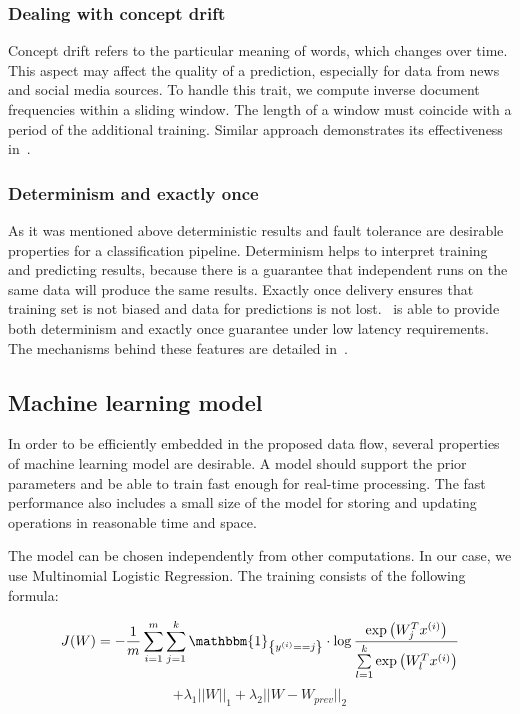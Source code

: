\subsubsection{Dealing with concept drift}

Concept drift refers to the particular meaning of words, which changes over time. This aspect may affect the quality of a prediction, especially for data from news and social media sources. To handle this trait, we compute inverse document frequencies within a sliding window. The length of a window must coincide with a period of the additional training. Similar approach demonstrates its effectiveness in~\cite{klinkenberg2000detecting}.

\subsubsection{Determinism and exactly once}

As it was mentioned above deterministic results and fault tolerance are desirable properties for a classification pipeline. Determinism helps to interpret training and predicting results, because there is a guarantee that independent runs on the same data will produce the same results. Exactly once delivery ensures that training set is not biased and data for predictions is not lost. \FlameStream\ is able to provide both determinism and exactly once guarantee under low latency requirements. The mechanisms behind these features are detailed in~\cite{we2018adbis, we2018beyondmr}.

\subsection{Machine learning model \label{ML}}

In order to be efficiently embedded in the proposed data flow, several properties of machine learning model are desirable. A model should support the prior parameters and be able to train fast enough for real-time processing. The fast performance also includes a small size of the model for storing and updating operations in reasonable time and space.

The model can be chosen independently from other computations. In our case, we use Multinomial Logistic Regression. The training consists of the following formula:

\begin{center}

$$ J(W) = -\frac{1}{m} \sum \limits_{i = 1}^{m} \sum \limits_{j = 1}^{k} \mathbbm{1}_{\left\{y^{(i)} == j\right\}} \cdot \log \frac{\exp\left({W_{j}^Tx^{(i)}}\right) }{\sum \limits_{l = 1}^{k}  \exp\left({W_{l}^Tx^{(i)}}\right) }$$ 
 $$ +  \lambda_1 ||W||_1 + \lambda_2 ||W - W_{prev}||_2 $$

\end{center} 

